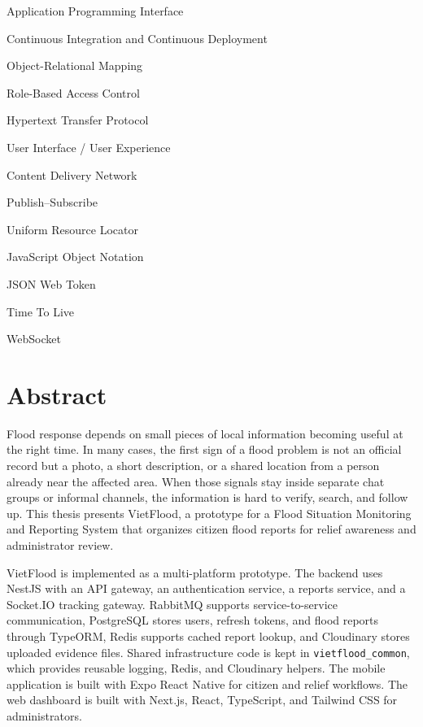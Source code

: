 \documentclass[12pt, twoside]{report}
\begin{document}
\begin{description}[
    align=left,
    labelwidth=3cm, %
    labelsep=1em %
] 
    \item[\textbf{API}] Application Programming Interface
    \item[\textbf{CI/CD}] Continuous Integration and Continuous Deployment
    \item[\textbf{ORM}] Object-Relational Mapping
    \item[\textbf{RBAC}] Role-Based Access Control
    \item[\textbf{HTTP}] Hypertext Transfer Protocol
    \item[\textbf{UI/UX}] User Interface / User Experience
    \item[\textbf{CDN}] Content Delivery Network
    \item[\textbf{PUB/SUB}] Publish--Subscribe 
    \item[\textbf{URL}] Uniform Resource Locator
    \item[\textbf{JSON}] JavaScript Object Notation
    \item[\textbf{JWT}] JSON Web Token
    \item[\textbf{TTL}] Time To Live
    \item[\textbf{WS}] WebSocket
\end{description}

\chapter*{Abstract}
Flood response depends on small pieces of local information becoming useful at the right time. In many cases, the first sign of a flood problem is not an official record but a photo, a short description, or a shared location from a person already near the affected area. When those signals stay inside separate chat groups or informal channels, the information is hard to verify, search, and follow up. This thesis presents VietFlood, a prototype for a Flood Situation Monitoring and Reporting System that organizes citizen flood reports for relief awareness and administrator review.

VietFlood is implemented as a multi-platform prototype. The backend uses NestJS with an API gateway, an authentication service, a reports service, and a Socket.IO tracking gateway. RabbitMQ supports service-to-service communication, PostgreSQL stores users, refresh tokens, and flood reports through TypeORM, Redis supports cached report lookup, and Cloudinary stores uploaded evidence files. Shared infrastructure code is kept in \texttt{vietflood\_common}, which provides reusable logging, Redis, and Cloudinary helpers. The mobile application is built with Expo React Native for citizen and relief workflows. The web dashboard is built with Next.js, React, TypeScript, and Tailwind CSS for administrators.
\end{document}
